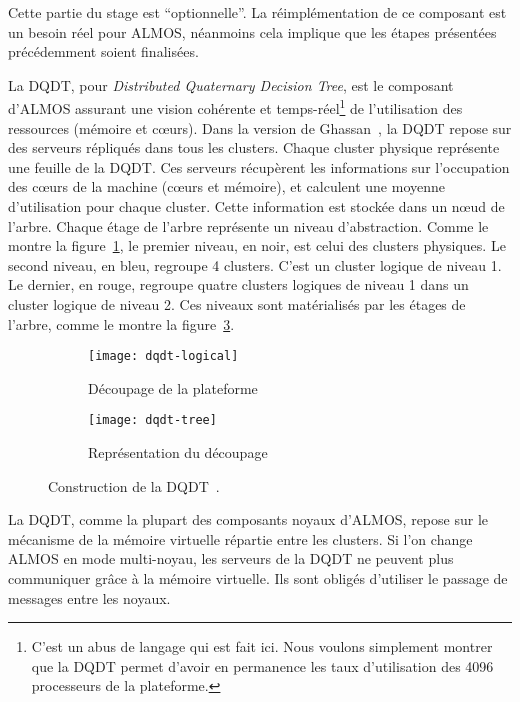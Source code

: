     Cette partie du stage est ``optionnelle''. La réimplémentation de ce
    composant est un besoin réel pour ALMOS, néanmoins cela implique que les
    étapes présentées précédemment soient finalisées.

    La DQDT, pour \textit{Distributed Quaternary Decision Tree}, est le
    composant d'ALMOS assurant une vision cohérente et temps-réel\footnote{C'est
      un abus de langage qui est fait ici. Nous voulons simplement montrer que
      la DQDT permet d'avoir en permanence les taux d'utilisation des 4096
      processeurs de la plateforme.} de l'utilisation des ressources (mémoire et
    c\oe urs). Dans la version de Ghassan~\citet{almaless2014universite}, la
    DQDT repose sur des serveurs répliqués dans tous les clusters. Chaque
    cluster physique représente une feuille de la DQDT. Ces serveurs récupèrent
    les informations sur l'occupation des c\oe urs de la machine (c\oe urs et
    mémoire), et calculent une moyenne d'utilisation pour chaque cluster. Cette
    information est stockée dans un n\oe ud de l'arbre. Chaque étage de l'arbre
    représente un niveau d'abstraction. Comme le montre la
    figure~\ref{fig:dqdt-logical}, le premier niveau, en noir, est celui des
    clusters physiques. Le second niveau, en bleu, regroupe 4 clusters. C'est un
    cluster logique de niveau 1. Le dernier, en rouge, regroupe quatre clusters
    logiques de niveau 1 dans un cluster logique de niveau 2. Ces niveaux sont
    matérialisés par les étages de l'arbre, comme le montre la
    figure~\ref{fig:dqdt-tree}.\\

    \begin{figure}[ht]
      \begin{subfigure}[b]{0.5\textwidth}
        \texttt{[image: dqdt-logical]}
        \caption{Découpage de la plateforme}
        \label{fig:dqdt-logical}
      \end{subfigure}
      \begin{subfigure}[b]{0.4\textwidth}
        \texttt{[image: dqdt-tree]}
        \caption{Représentation du découpage}
        \label{fig:dqdt-tree}
      \end{subfigure}
      \caption{Construction de la DQDT~\citep{almaless2014universite}.}
    \end{figure}

    La DQDT, comme la plupart des composants noyaux d'ALMOS, repose sur le
    mécanisme de la mémoire virtuelle répartie entre les clusters. Si l'on
    change ALMOS en mode multi-noyau, les serveurs de la DQDT ne peuvent plus
    communiquer grâce à la mémoire virtuelle. Ils sont obligés d'utiliser le
    passage de messages entre les noyaux.

